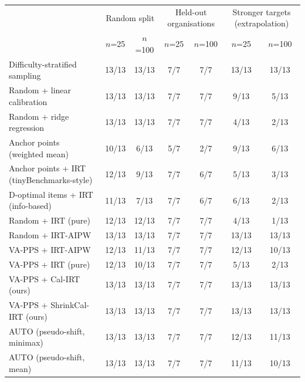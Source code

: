 \begin{tabular}{lcccccc}
\toprule
 & \multicolumn{2}{c}{Random split} & \multicolumn{2}{c}{Held-out organisations} & \multicolumn{2}{c}{Stronger targets (extrapolation)} \\
 & $n$=25 & $n$=100 & $n$=25 & $n$=100 & $n$=25 & $n$=100 \\
\midrule
Difficulty-stratified sampling & 13/13 & 13/13 & 7/7 & 7/7 & 13/13 & 13/13 \\
Random + linear calibration & 13/13 & 13/13 & 7/7 & 7/7 & 9/13 & 5/13 \\
Random + ridge regression & 13/13 & 13/13 & 7/7 & 7/7 & 4/13 & 2/13 \\
Anchor points (weighted mean) & 10/13 & 6/13 & 5/7 & 2/7 & 9/13 & 6/13 \\
Anchor points + IRT (tinyBenchmarks-style) & 12/13 & 9/13 & 7/7 & 6/7 & 5/13 & 3/13 \\
D-optimal items + IRT (info-based) & 11/13 & 7/13 & 7/7 & 6/7 & 6/13 & 2/13 \\
Random + IRT (pure) & 12/13 & 12/13 & 7/7 & 7/7 & 4/13 & 1/13 \\
Random + IRT-AIPW & 13/13 & 13/13 & 7/7 & 7/7 & 13/13 & 13/13 \\
VA-PPS + IRT-AIPW & 12/13 & 11/13 & 7/7 & 7/7 & 12/13 & 10/13 \\
VA-PPS + IRT (pure) & 12/13 & 10/13 & 7/7 & 7/7 & 5/13 & 2/13 \\
VA-PPS + Cal-IRT (ours) & 13/13 & 13/13 & 7/7 & 7/7 & 13/13 & 13/13 \\
VA-PPS + ShrinkCal-IRT (ours) & 13/13 & 13/13 & 7/7 & 7/7 & 13/13 & 13/13 \\
AUTO (pseudo-shift, minimax) & 13/13 & 13/13 & 7/7 & 7/7 & 12/13 & 11/13 \\
AUTO (pseudo-shift, mean) & 13/13 & 13/13 & 7/7 & 7/7 & 11/13 & 10/13 \\
\bottomrule
\end{tabular}
